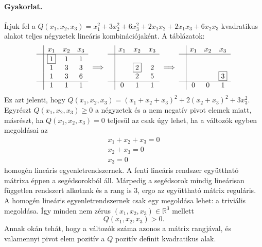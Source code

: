 \documentclass[a4paper, showtrims]{memoir}
\theoremstyle{plain}
\theoremstyle{remark}
\theoremstyle{definition}
\begin{document}
\paragraph{Gyakorlat.}
Írjuk fel a 
\(
Q\left( x_1,x_2,x_3 \right)=
x_1^2+3x_2^2+6x_3^2+
2x_1x_2+2x_1x_3+
6x_2x_3
\)
kvadratikus alakot teljes négyzetek lineáris kombinációjaként.
A táblázatok:
\[
\begin{array}{c|ccc}
     & x_1       & x_2 & x_3 \\
     \hline
     & \boxed{1} & 1   & 1   \\
     & 1         & 3   & 3   \\
     & 1         & 3   & 6   \\
    \hline
    & 1     & 1   & 1
\end{array}
\implies
\begin{array}{c|ccc}
     & x_1& x_2  & x_3 \\
     \hline
     & &                &     \\
     & & \boxed{2}      & 2   \\
     & & 2              & 5   \\
     \hline
     &0 & 1         & 1
\end{array}
\implies
\begin{array}{c|ccc}
     & x_1 & x_2 & x_3      \\
     \hline
     &     &     &          \\
     &     &     &          \\
     &     &     & \boxed{3}\\
    \hline
     & 0&0          & 1
\end{array}
\]
Ez azt jelenti, hogy 
\(
Q\left( x_1,x_2,x_3 \right)
=
\left( x_1+x_2+x_3 \right)^2
+2\left( x_2+x_3 \right)^2
+3x_3^2.
\)
Egyrészt $Q\left( x_1,x_2,x_3 \right)\geq 0$ a négyzetek és a nem negatív pivot elemek miatt,
másrészt, 
ha $Q\left( x_1,x_2,x_3 \right)=0$ teljesül az csak úgy lehet, 
ha a változók egyben megoldásai az
\[
\begin{array}{r}
    x_1+x_2+x_3= 0\\
    x_2+x_3= 0\\
    x_3= 0
\end{array}
\]
homogén lineáris egyenletrendszernek.
A fenti lineáris rendszer együttható mátrixa éppen a segédsorokból áll.
Márpedig a segédsorok mindig lineárisan független rendszert alkotnak és a rang is $3$, ergo az együttható mátrix reguláris.
A homogén lineáris egyenletrendszernek csak egy megoldása lehet: a triviális megoldása.
Így minden nem zérus $\left( x_1,x_2,x_3 \right)\in \mathbb{R}^3$ mellett 
\[
    Q\left( x_1,x_2,x_3 \right)>0.
\]
Annak okán tehát, hogy a változók száma azonos a mátrix rangjával, és valamennyi pivot elem pozitív a $Q$ pozitív definit kvadratikus alak.
\end{document}
